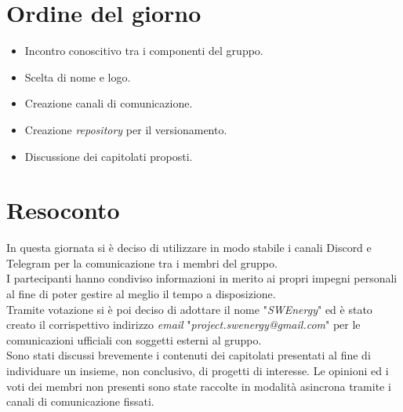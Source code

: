 \section{Ordine del giorno}
\begin{itemize}
    \item Incontro conoscitivo tra i componenti del gruppo.
    \item Scelta di nome e logo.
    \item Creazione canali di comunicazione.
    \item Creazione \textit{repository} per il versionamento.
    \item Discussione dei capitolati proposti.
\end{itemize}

\section{Resoconto}
In questa giornata si è deciso di utilizzare in modo stabile i canali Discord e Telegram per la comunicazione tra i membri del gruppo.\\
I partecipanti hanno condiviso informazioni in merito ai propri impegni personali al fine di poter gestire al meglio il tempo a disposizione. \\

\noindent
Tramite votazione si è poi deciso di adottare il nome "\textit{SWEnergy}" ed è stato creato il corrispettivo indirizzo \textit{email} "\textit{project.swenergy@gmail.com}" per le comunicazioni ufficiali con soggetti esterni al gruppo. \\

\noindent
Sono stati discussi brevemente i contenuti dei capitolati presentati al fine di individuare un insieme, non conclusivo, di progetti di interesse.
Le opinioni ed i voti dei membri non presenti sono state raccolte in modalità asincrona tramite i canali di comunicazione fissati.
